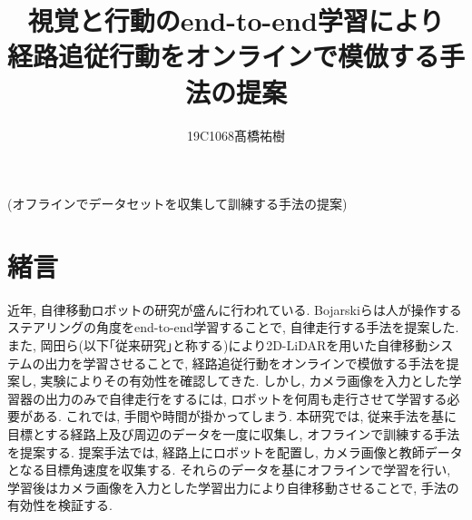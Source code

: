 \documentclass[10pt]{ujarticle}
\begin{document}
    
    \makeatletter
    \title{視覚と行動のend-to-end学習により\\経路追従行動をオンラインで模倣する手法の提案}{(オフラインでデータセットを収集して訓練する手法の提案)}
    
    \author{19C1068\hspace{.5zw}髙橋祐樹}
    
    \makeatother
    
    
    
    \maketitle
    
    
    \section{緒\hspace{2zw}言}%
    近年, 自律移動ロボットの研究が盛んに行われている. Bojarskiら\cite{bojarski}は人が操作するステアリングの角度をend-to-end学習することで, 自律走行する手法を提案した. また, 岡田ら\cite{si2020-okada}\cite{si2021-okada}(以下｢従来研究｣と称する)により2D-LiDARを用いた自律移動システムの出力を学習させることで, 経路追従行動をオンラインで模倣する手法を提案し, 実験によりその有効性を確認してきた. しかし, カメラ画像を入力とした学習器の出力のみで自律走行をするには, ロボットを何周も走行させて学習する必要がある. これでは, 手間や時間が掛かってしまう. 本研究では, 従来手法を基に目標とする経路上及び周辺のデータを一度に収集し, オフラインで訓練する手法を提案する. 提案手法では, 経路上にロボットを配置し, カメラ画像と教師データとなる目標角速度を収集する. それらのデータを基にオフラインで学習を行い, 学習後はカメラ画像を入力とした学習出力により自律移動させることで, 手法の有効性を検証する. 
    
\end{document}
